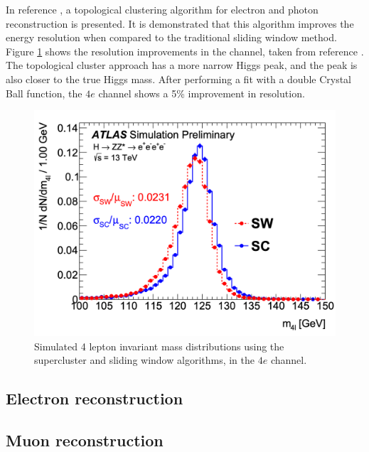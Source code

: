 In reference \cite{ATL-PHYS-PUB-2017-022}, a topological clustering algorithm for electron and photon reconstruction is presented. It is demonstrated that this algorithm improves the energy resolution when compared to the traditional sliding window method. Figure \ref{fig:H4l_topo_cluster} shows the resolution improvements in the \HFourL channel, taken from reference \cite{ATL-PHYS-PUB-2017-022}. The topological cluster approach has a more narrow Higgs peak, and the peak is also closer to the true Higgs mass. After performing a fit with a double Crystal Ball function, the $4e$ channel shows a 5\% improvement in resolution.
\begin{figure}
    \centering
    \includegraphics[width=\mediumfigwidth]{Figures/LHC/H4l_topo_cluster.png}
    \caption{Simulated 4 lepton invariant mass distributions using the supercluster and sliding window algorithms, in the $4e$ channel.}
    \label{fig:H4l_topo_cluster}
\end{figure}

\subsection{Electron reconstruction}



\subsection{Muon reconstruction}
\cite{ATLAS:2020xtq}

